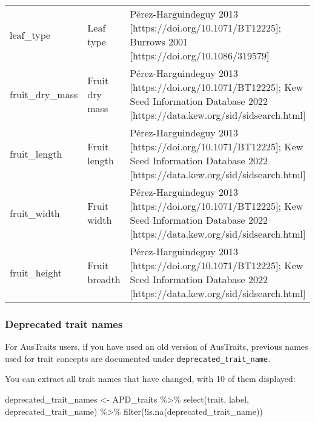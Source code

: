 \documentclass[
  letterpaper,
  DIV=11,
  numbers=noendperiod]{scrartcl}
\newenvironment{Shaded}{\begin{snugshade}}{\end{snugshade}}
\newcommand{\FunctionTok}[1]{\textcolor[rgb]{0.28,0.35,0.67}{#1}}
\newcommand{\NormalTok}[1]{\textcolor[rgb]{0.00,0.23,0.31}{#1}}
\newcommand{\OtherTok}[1]{\textcolor[rgb]{0.00,0.23,0.31}{#1}}
\newcommand{\SpecialCharTok}[1]{\textcolor[rgb]{0.37,0.37,0.37}{#1}}
\begin{document}
\begin{tabular}{>{\raggedright\arraybackslash}p{5cm}>{\raggedright\arraybackslash}p{5cm}>{\raggedright\arraybackslash}p{7cm}}
\addlinespace
leaf\_type & Leaf type & Pérez-Harguindeguy 2013 [https://doi.org/10.1071/BT12225]; Burrows 2001 [https://doi.org/10.1086/319579]\\
fruit\_dry\_mass & Fruit dry mass & Pérez-Harguindeguy 2013 [https://doi.org/10.1071/BT12225]; Kew Seed Information Database 2022 [https://data.kew.org/sid/sidsearch.html]\\
fruit\_length & Fruit length & Pérez-Harguindeguy 2013 [https://doi.org/10.1071/BT12225]; Kew Seed Information Database 2022 [https://data.kew.org/sid/sidsearch.html]\\
fruit\_width & Fruit width & Pérez-Harguindeguy 2013 [https://doi.org/10.1071/BT12225]; Kew Seed Information Database 2022 [https://data.kew.org/sid/sidsearch.html]\\
fruit\_height & Fruit breadth & Pérez-Harguindeguy 2013 [https://doi.org/10.1071/BT12225]; Kew Seed Information Database 2022 [https://data.kew.org/sid/sidsearch.html]\\
\bottomrule
\end{tabular}

\pagebreak

\hypertarget{deprecated-trait-names}{%
\subsubsection{Deprecated trait names}\label{deprecated-trait-names}}

For AusTraits users, if you have used an old version of AusTraits,
previous names used for trait concepts are documented under
\texttt{deprecated\_trait\_name}.

You can extract all trait names that have changed, with 10 of them
displayed:

\begin{Shaded}
\begin{Highlighting}[]
\NormalTok{deprecated\_trait\_names }\OtherTok{\textless{}{-}} 
\NormalTok{  APD\_traits }\SpecialCharTok{\%\textgreater{}\%}
  \FunctionTok{select}\NormalTok{(trait, label, deprecated\_trait\_name) }\SpecialCharTok{\%\textgreater{}\%}
  \FunctionTok{filter}\NormalTok{(}\SpecialCharTok{!}\FunctionTok{is.na}\NormalTok{(deprecated\_trait\_name))}
\end{Highlighting}
\end{Shaded}
\end{document}
